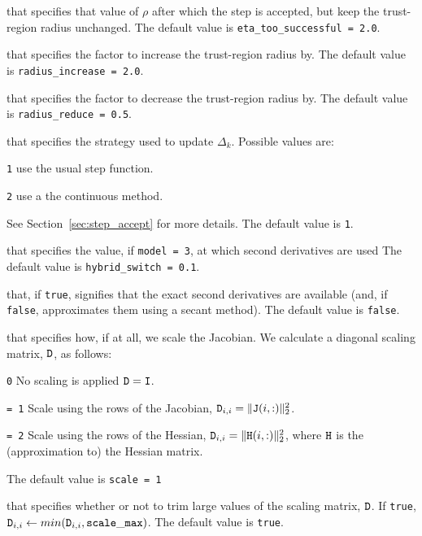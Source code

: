 \begin{description}
that specifies that value of $\rho$ after which the step is accepted, but keep the trust-region radius unchanged.
The default value is {\tt eta\_too\_successful = 2.0}.

that specifies the factor to increase the trust-region radius by.
The default value is {\tt radius\_increase = 2.0}.

that specifies the factor to decrease the trust-region radius by.
The default value is {\tt radius\_reduce = 0.5}.

that specifies the strategy used to update $\Delta_k$.  Possible values are:
\begin{description}
\item {\tt 1} use the usual step function.
\item {\tt 2} use a the continuous method.
\end{description}
See Section~\ref{sec:step_accept} for more details.
The default value is {\tt 1}.

that specifies the value, if {\tt model = 3}, at which second derivatives are used
The default value is {\tt hybrid\_switch = 0.1}.

that, if {\tt true}, signifies that the exact second derivatives are available (and, if {\tt false}, approximates them using a secant method).
The default value is {\tt false}.

that specifies how, if at all, we scale the Jacobian.  We calculate a diagonal scaling matrix, ${\tt D}$, as follows: 
\begin{description}
\item{\tt 0} No scaling is applied ${\tt D} ={\tt I}$.
\item{\tt = 1} Scale using the rows of the Jacobian, \({\tt D}_{i,i} = \|{\tt J}(i,:)\|_2^2\).
\item{\tt = 2} Scale using the rows of the Hessian,  \({\tt D}_{i,i} = \|{\tt H}(i,:)\|_2^2\), where ${\tt H}$ is the (approximation to) the Hessian matrix.
\end{description}
The default value is {\tt scale = 1}

that specifies whether or not to trim large values of the scaling matrix, ${\tt D}$.
If {\tt true}, ${\tt D}_{i,i} \leftarrow min({\tt D}_{i,i}, {\tt scale\_max})$.
The default value is {\tt true}.


\end{description}
